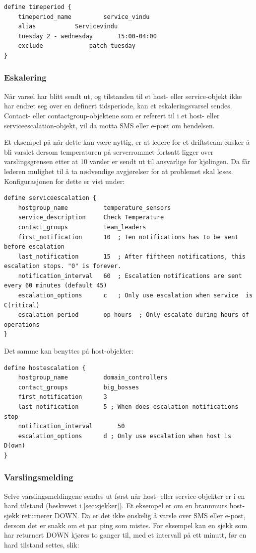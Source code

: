 \begin{lstlisting}[style=example]
define timeperiod {
    timeperiod_name     	service_vindu
    alias			Servicevindu
    tuesday 2 - wednesday   	15:00-04:00
    exclude 			patch_tuesday
}
\end{lstlisting}

\subsubsection{Eskalering}
Når varsel har blitt sendt ut, og tilstanden til et host- eller service-objekt ikke har endret seg over en definert tidsperiode, kan et eskaleringsvarsel sendes. Contact- eller contactgroup-objektene som er referert til i et host- eller serviceescalation-objekt, vil da motta SMS eller e-post om hendelsen.

Et eksempel på når dette kan være nyttig, er at ledere for et driftsteam ønsker å bli varslet dersom temperaturen på serverrommet fortsatt ligger over varslingsgrensen etter at 10 varsler er sendt ut til ansvarlige for kjølingen. Da får lederen mulighet til å ta nødvendige avgjørelser for at problemet skal løses. Konfigurasjonen for dette er vist under:
\begin{lstlisting}[style=example]
define serviceescalation {
	hostgroup_name			temperature_sensors
	service_description		Check Temperature
	contact_groups			team_leaders
	first_notification		10	; Ten notifications has to be sent before escalation
	last_notification		15	; After fiftheen notifications, this escalation stops. "0" is forever.
	notification_interval	60 	; Escalation notifications are sent every 60 minutes (default 45)
	escalation_options		c	; Only use escalation when service  is C(ritical)
	escalation_period		op_hours  ; Only escalate during hours of operations
}
\end{lstlisting}
Det samme kan benyttes på host-objekter:
\begin{lstlisting}[style=example]
define hostescalation {
	hostgroup_name			domain_controllers
	contact_groups			big_bosses
	first_notification		3 	
	last_notification		5 ; When does escalation notifications stop
	notification_interval		50
	escalation_options		d ; Only use escalation when host is D(own)
}
\end{lstlisting}

\subsubsection{Varslingsmelding}
Selve varslingsmeldingene sendes ut først når host- eller service-objekter er i en hard tilstand (beskrevet i \ref{sec:sjekker}). Et eksempel er om en brannmurs host-sjekk returnerer DOWN. Da er det ikke ønskelig å varsle over SMS eller e-post, dersom det er snakk om et par ping som mistes. For eksempel kan en sjekk som har returnert DOWN kjøres to ganger til, med et intervall på ett minutt, før en hard tilstand settes, slik:

